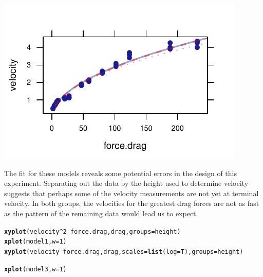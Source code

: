 \documentclass[twoside]{book}\usepackage[]{graphicx}\usepackage[]{xcolor}
\makeatletter
\def\maxwidth{ %
  \ifdim\Gin@nat@width>\linewidth
    \linewidth
  \else
    \Gin@nat@width
  \fi
}
\newcommand{\hlnum}[1]{\textcolor[rgb]{0.686,0.059,0.569}{#1}}%
\newcommand{\hlopt}[1]{\textcolor[rgb]{0,0,0}{#1}}%
\newcommand{\hlstd}[1]{\textcolor[rgb]{0.345,0.345,0.345}{#1}}%
\newcommand{\hlkwc}[1]{\textcolor[rgb]{0.333,0.667,0.333}{#1}}%
\newcommand{\hlkwd}[1]{\textcolor[rgb]{0.737,0.353,0.396}{\textbf{#1}}}%
\newenvironment{kframe}{%
 \def\at@end@of@kframe{}%
 \ifinner\ifhmode%
  \def\at@end@of@kframe{\end{minipage}}%
  \begin{minipage}{\columnwidth}%
 \fi\fi%
 \def\FrameCommand##1{\hskip\@totalleftmargin \hskip-\fboxsep
 \colorbox{shadecolor}{##1}\hskip-\fboxsep
     \hskip-\linewidth \hskip-\@totalleftmargin \hskip\columnwidth}%
 \MakeFramed {\advance\hsize-\width
   \@totalleftmargin\z@ \linewidth\hsize
   \@setminipage}}%
 {\par\unskip\endMakeFramed%
 \at@end@of@kframe}
\newenvironment{knitrout}{}{} %
\makeatother
\begin{document}
\begin{solution}
\begin{knitrout}
{\includegraphics[width=\maxwidth]{figures/fig-unnamed-chunk-221-4} 

}



\end{knitrout}

The fit for these models reveals some 
potential errors in the design of this experiment.  Separating out the data
by the height used to determine velocity suggests that perhaps some of the 
velocity measurements are not yet at terminal velocity.
In both groups, the velocities for the greatest drag forces are 
not as fast as the pattern of the remaining data would lead us to expect.

\begin{knitrout}
\color{fgcolor}\begin{kframe}
\begin{alltt}
\hlkwd{xyplot}\hlstd{(velocity}\hlopt{^}\hlnum{2} \hlopt{~} \hlstd{force.drag, drag,} \hlkwc{groups}\hlstd{=height)}
\hlkwd{xplot}\hlstd{(model1,}\hlkwc{w}\hlstd{=}\hlnum{1}\hlstd{)}
\hlkwd{xyplot}\hlstd{(velocity} \hlopt{~} \hlstd{force.drag, drag,} \hlkwc{scales}\hlstd{=}\hlkwd{list}\hlstd{(}\hlkwc{log}\hlstd{=T),}\hlkwc{groups}\hlstd{=height)}
\end{alltt}


{\ttfamily\noindent\bfseries{}}\begin{alltt}
\hlkwd{xplot}\hlstd{(model3,}\hlkwc{w}\hlstd{=}\hlnum{1}\hlstd{)}
\end{alltt}
\end{kframe}


\end{knitrout}
\end{solution}
\end{document}
